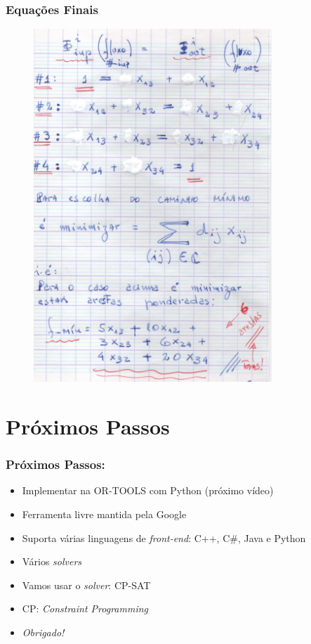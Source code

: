 \documentclass{beamer}
\begin{document}
\begin{frame}
	\frametitle{Equações Finais}
	
	\begin{figure}[tbp]
		\includegraphics[width=0.8\textwidth , height=0.8\textheight]{09_equacoes_finais.pdf}
		\centering
	\end{figure}
\end{frame}

\section{Próximos Passos}

\begin{frame} 
	\frametitle{Próximos Passos:}
	
\begin{block}{}
	
	\begin{itemize}
		\item Implementar na OR-TOOLS  com Python (próximo vídeo)
		\item Ferramenta livre mantida pela Google
		\item Suporta várias linguagens de \textit{front-end}: C++, C\#, Java e Python
		\item Vários \textit{solvers}
		\item Vamos usar o {\em solver}: CP-SAT
		\item CP: \textit{Constraint Programming}
				
		\item \textit{Obrigado!}
		
	\end{itemize}
\end{block}
\end{frame}
\end{document}
